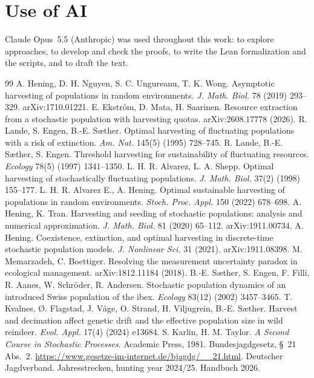 \documentclass[11pt]{article}
\theoremstyle{definition}
\begin{document}
\section{Use of AI}
Claude Opus~5.5 (Anthropic) was used throughout this work: to explore approaches, to develop and check the
proofs, to write the Lean formalization and the scripts, and to draft the text.

\begin{thebibliography}{99}
 A. Hening, D. H. Nguyen, S. C. Ungureanu, T. K. Wong. Asymptotic harvesting of populations in
random environments. \emph{J. Math. Biol.} 78 (2019) 293--329. arXiv:1710.01221.
 E. Ekstr\"om, D. Mata, H. Saarinen. Resource extraction from a stochastic population with
harvesting quotas. arXiv:2608.17778 (2026).
 R. Lande, S. Engen, B.-E. S\ae ther. Optimal harvesting of fluctuating populations with a risk
of extinction. \emph{Am. Nat.} 145(5) (1995) 728--745.
 R. Lande, B.-E. S\ae ther, S. Engen. Threshold harvesting for sustainability of fluctuating
resources. \emph{Ecology} 78(5) (1997) 1341--1350.
 L. H. R. Alvarez, L. A. Shepp. Optimal harvesting of stochastically fluctuating populations.
\emph{J. Math. Biol.} 37(2) (1998) 155--177.
 L. H. R. Alvarez E., A. Hening. Optimal sustainable harvesting of populations in random
environments. \emph{Stoch. Proc. Appl.} 150 (2022) 678--698.
 A. Hening, K. Tran. Harvesting and seeding of stochastic populations: analysis and
numerical approximation. \emph{J. Math. Biol.} 81 (2020) 65--112. arXiv:1911.00734.
 A. Hening. Coexistence, extinction, and optimal harvesting in discrete-time stochastic
population models. \emph{J. Nonlinear Sci.} 31 (2021). arXiv:1911.08398.
 M. Memarzadeh, C. Boettiger. Resolving the measurement uncertainty paradox in ecological
management. arXiv:1812.11184 (2018).
 B.-E. S\ae ther, S. Engen, F. Filli, R. Aanes, W. Schr\"oder, R. Andersen. Stochastic
population dynamics of an introduced Swiss population of the ibex. \emph{Ecology} 83(12) (2002) 3457--3465.
 T. Kvalnes, \O. Flagstad, J. V\aa ge, O. Strand, H. Viljugrein, B.-E. S\ae ther. Harvest and
decimation affect genetic drift and the effective population size in wild reindeer. \emph{Evol. Appl.} 17(4)
(2024) e13684.
 S. Karlin, H. M. Taylor. \emph{A Second Course in Stochastic Processes}. Academic Press, 1981.
 Bundesjagdgesetz, \S~21 Abs.~2. \url{https://www.gesetze-im-internet.de/bjagdg/__21.html}.
 Deutscher Jagdverband. Jahresstrecken, hunting year 2024/25. Handbuch 2026.
\end{thebibliography}
\end{document}
